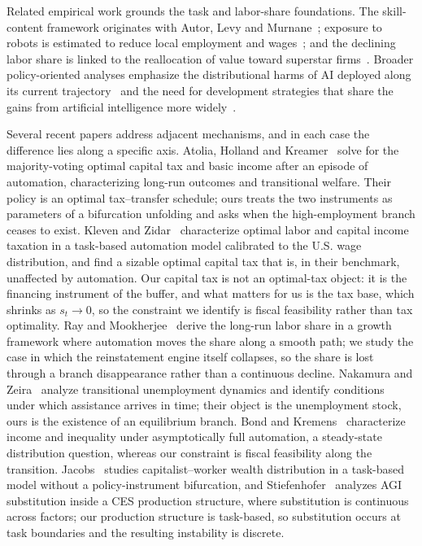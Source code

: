 \documentclass[review,12pt]{elsarticle}
\theoremstyle{plain}
\theoremstyle{definition}
\theoremstyle{remark}
\begin{document}
Related empirical work grounds the task and labor-share foundations. The skill-content framework originates with Autor, Levy and Murnane~\cite{ALM2003}; exposure to robots is estimated to reduce local employment and wages~\cite{AR2020}; and the declining labor share is linked to the reallocation of value toward superstar firms~\cite{ADKPV2020}. Broader policy-oriented analyses emphasize the distributional harms of AI deployed along its current trajectory~\cite{Acemoglu2021} and the need for development strategies that share the gains from artificial intelligence more widely~\cite{KS2021}.

Several recent papers address adjacent mechanisms, and in each case the difference lies along a specific axis. Atolia, Holland and Kreamer~\cite{Atolia2024} solve for the majority-voting optimal capital tax and basic income after an episode of automation, characterizing long-run outcomes and transitional welfare. Their policy is an optimal tax--transfer schedule; ours treats the two instruments as parameters of a bifurcation unfolding and asks when the high-employment branch ceases to exist. Kleven and Zidar~\cite{KlevenZidar2026} characterize optimal labor and capital income taxation in a task-based automation model calibrated to the U.S. wage distribution, and find a sizable optimal capital tax that is, in their benchmark, unaffected by automation. Our capital tax is not an optimal-tax object: it is the financing instrument of the buffer, and what matters for us is the tax base, which shrinks as $s_t\to0$, so the constraint we identify is fiscal feasibility rather than tax optimality. Ray and Mookherjee~\cite{RayMookherjee2022} derive the long-run labor share in a growth framework where automation moves the share along a smooth path; we study the case in which the reinstatement engine itself collapses, so the share is lost through a branch disappearance rather than a continuous decline. Nakamura and Zeira~\cite{NakamuraZeira2024} analyze transitional unemployment dynamics and identify conditions under which assistance arrives in time; their object is the unemployment stock, ours is the existence of an equilibrium branch. Bond and Kremens~\cite{BondKremens2024} characterize income and inequality under asymptotically full automation, a steady-state distribution question, whereas our constraint is fiscal feasibility along the transition. Jacobs~\cite{Jacobs2023} studies capitalist--worker wealth distribution in a task-based model without a policy-instrument bifurcation, and Stiefenhofer~\cite{Stiefenhofer2025} analyzes AGI substitution inside a CES production structure, where substitution is continuous across factors; our production structure is task-based, so substitution occurs at task boundaries and the resulting instability is discrete.
\end{document}
